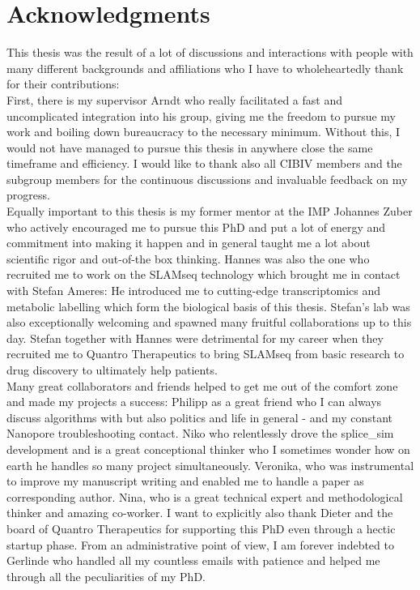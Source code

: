 
\chapter*{Acknowledgments}
This thesis was the result of a lot of discussions and interactions with people with many different backgrounds and affiliations who I have to wholeheartedly thank for their contributions: \\
First, there is my supervisor Arndt who really facilitated a fast and uncomplicated integration into his group, giving me the freedom to pursue my work and boiling down bureaucracy to the necessary minimum. Without this, I would not have managed to pursue this thesis in anywhere close the same timeframe and efficiency. I would like to thank also all CIBIV members and the subgroup members for the continuous discussions and invaluable feedback on my progress. \\
Equally important to this thesis is my former mentor at the IMP Johannes Zuber who actively encouraged me to pursue this PhD and put a lot of energy and commitment into making it happen and in general taught me a lot about scientific rigor and out-of-the box thinking. Hannes was also the one who recruited me to work on the SLAMseq technology which brought me in contact with Stefan Ameres: He introduced me to cutting-edge transcriptomics and metabolic labelling which form the biological basis of this thesis. Stefan's lab was also exceptionally welcoming and spawned many fruitful collaborations up to this day. Stefan together with Hannes were detrimental for my career when they recruited me to Quantro Therapeutics to bring SLAMseq from basic research to drug discovery to ultimately help patients. \\
Many great collaborators and friends helped to get me out of the comfort zone and made my projects a success: Philipp as a great friend who I can always discuss algorithms with but also politics and life in general - and my constant Nanopore troubleshooting contact. Niko who relentlessly drove the splice\_sim development and is a great conceptional thinker who I sometimes wonder how on earth he handles so many project simultaneously. Veronika, who was instrumental to improve my manuscript writing and enabled me to handle a paper as corresponding author. Nina, who is a great technical expert and methodological thinker and amazing co-worker. I want to explicitly also thank Dieter and the board of Quantro Therapeutics for supporting this PhD even through a hectic startup phase. From an administrative point of view, I am forever indebted to Gerlinde who handled all my countless emails with patience and helped me through all the peculiarities of my PhD. \\
